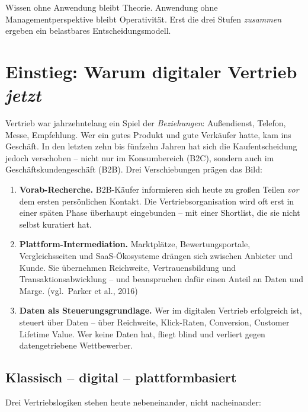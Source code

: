 \documentclass[11pt,a4paper,oneside]{article}
\newcommand{\fachbegriff}[1]{\textbf{#1}}
\newcommand{\quelle}[1]{{\footnotesize\color{lpGray}(#1)}}
\begin{document}
\begin{merkbox}
Wissen ohne Anwendung bleibt Theorie. Anwendung ohne Managementperspektive bleibt Operativität. Erst die drei Stufen \emph{zusammen} ergeben ein belastbares Entscheidungsmodell.
\end{merkbox}

\clearpage

\section{Einstieg: Warum digitaler Vertrieb \emph{jetzt}}

Vertrieb war jahrzehntelang ein Spiel der \emph{Beziehungen}: Außendienst, Telefon, Messe, Empfehlung. Wer ein gutes Produkt und gute Verkäufer hatte, kam ins Geschäft. In den letzten zehn bis fünfzehn Jahren hat sich die Kaufentscheidung jedoch verschoben -- nicht nur im Konsumbereich (B2C), sondern auch im Geschäftskundengeschäft (B2B). Drei Verschiebungen prägen das Bild:

\begin{enumerate}
  \item \fachbegriff{Vorab-Recherche.} B2B-Käufer informieren sich heute zu großen Teilen \emph{vor} dem ersten persönlichen Kontakt. Die Vertriebsorganisation wird oft erst in einer späten Phase überhaupt eingebunden -- mit einer Shortlist, die sie nicht selbst kuratiert hat.
  \item \fachbegriff{Plattform-Intermediation.} Marktplätze, Bewertungsportale, Vergleichsseiten und SaaS-Ökosysteme drängen sich zwischen Anbieter und Kunde. Sie übernehmen Reichweite, Vertrauensbildung und Transaktionsabwicklung -- und beanspruchen dafür einen Anteil an Daten und Marge. \quelle{vgl.\ Parker et al., 2016}
  \item \fachbegriff{Daten als Steuerungsgrundlage.} Wer im digitalen Vertrieb erfolgreich ist, steuert über Daten -- über Reichweite, Klick-Raten, Conversion, Customer Lifetime Value. Wer keine Daten hat, fliegt blind und verliert gegen datengetriebene Wettbewerber.
\end{enumerate}

\subsection{Klassisch -- digital -- plattformbasiert}

Drei Vertriebslogiken stehen heute nebeneinander, nicht nacheinander:
\end{document}
